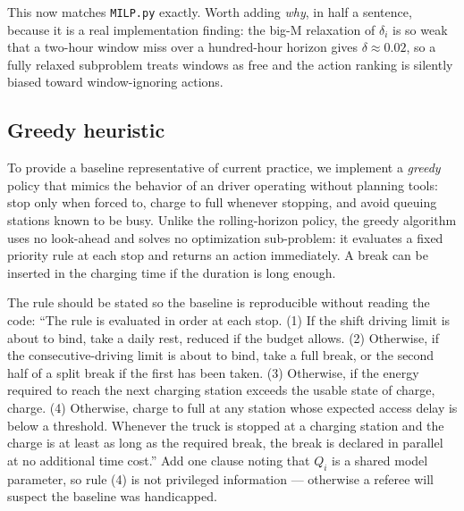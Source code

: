 \begin{acmt}
This now matches \texttt{MILP.py} exactly. Worth adding \emph{why}, in half a
sentence, because it is a real implementation finding: the big-M relaxation of
$\delta_i$ is so weak that a two-hour window miss over a hundred-hour horizon
gives $\delta \approx 0.02$, so a fully relaxed subproblem treats windows as
free and the action ranking is silently biased toward window-ignoring actions.
\end{acmt}

\subsection{Greedy heuristic} \label{sec:greedy}
To provide a baseline representative of current practice, we implement a \emph{greedy} policy that mimics the behavior of an driver operating without planning tools: stop only when forced to, charge to full whenever stopping, and avoid queuing stations known to be busy. Unlike the rolling-horizon policy, the greedy algorithm uses no look-ahead and solves no optimization sub-problem: it evaluates a fixed priority rule at each stop and returns an action immediately. A break can be inserted in the charging time if the duration is long enough.

\begin{anew}
The rule should be stated so the baseline is reproducible without reading the
code: ``The rule is evaluated in order at each stop. (1) If the shift driving
limit is about to bind, take a daily rest, reduced if the budget allows. (2)
Otherwise, if the consecutive-driving limit is about to bind, take a full break,
or the second half of a split break if the first has been taken. (3) Otherwise,
if the energy required to reach the next charging station exceeds the usable
state of charge, charge. (4) Otherwise, charge to full at any station whose
expected access delay is below a threshold. Whenever the truck is stopped at a
charging station and the charge is at least as long as the required break, the
break is declared in parallel at no additional time cost.'' Add one clause noting
that $Q_i$ is a shared model parameter, so rule (4) is not privileged
information --- otherwise a referee will suspect the baseline was handicapped.
\end{anew}

